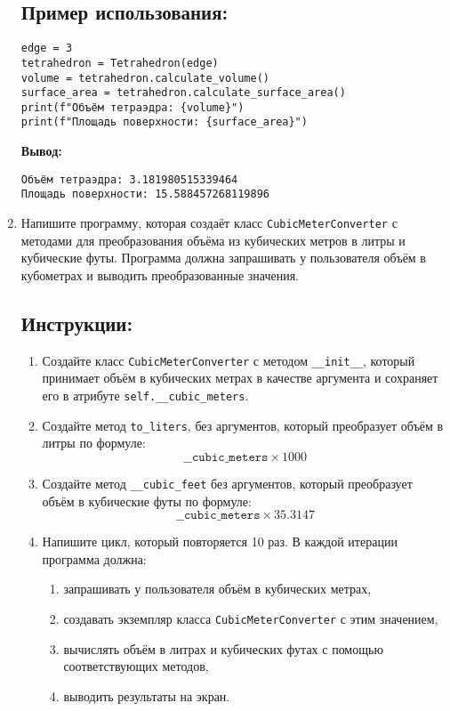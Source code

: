 \begin{enumerate}
\subsection*{Пример использования:}
\begin{verbatim}
edge = 3
tetrahedron = Tetrahedron(edge)
volume = tetrahedron.calculate_volume()
surface_area = tetrahedron.calculate_surface_area()
print(f"Объём тетраэдра: {volume}")
print(f"Площадь поверхности: {surface_area}")
\end{verbatim}

\textbf{Вывод:}
\begin{verbatim}
Объём тетраэдра: 3.181980515339464
Площадь поверхности: 15.588457268119896
\end{verbatim}

\item
Напишите программу, которая создаёт класс \texttt{CubicMeterConverter} с методами для преобразования объёма
из кубических метров в литры и кубические футы. Программа должна запрашивать у пользователя объём в кубометрах
и выводить преобразованные значения.

\subsection*{Инструкции:}
\begin{enumerate}
\item Создайте класс \texttt{CubicMeterConverter} с методом
\texttt{\_\_init\_\_}, который принимает объём в кубических метрах в
качестве аргумента и сохраняет его в атрибуте \texttt{self.\_\_cubic\_meters}.

\item Создайте метод \texttt{to\_liters},
без аргументов, который преобразует объём в литры по формуле:
\[
\texttt{\_\_cubic\_meters} \times 1000
\]

\item Создайте метод \texttt{\_\_cubic\_feet} без аргументов,
который преобразует объём в кубические футы по формуле:
\[
\texttt{\_\_cubic\_meters} \times 35.3147
\]

\item Напишите цикл, который повторяется 10 раз. В каждой итерации программа должна:
\begin{enumerate}
\item запрашивать у пользователя объём в кубических метрах,
\item создавать экземпляр класса \texttt{CubicMeterConverter} с этим значением,
\item вычислять объём в литрах и кубических футах с помощью соответствующих методов,
\item выводить результаты на экран.
\end{enumerate}
\end{enumerate}


\end{enumerate}
